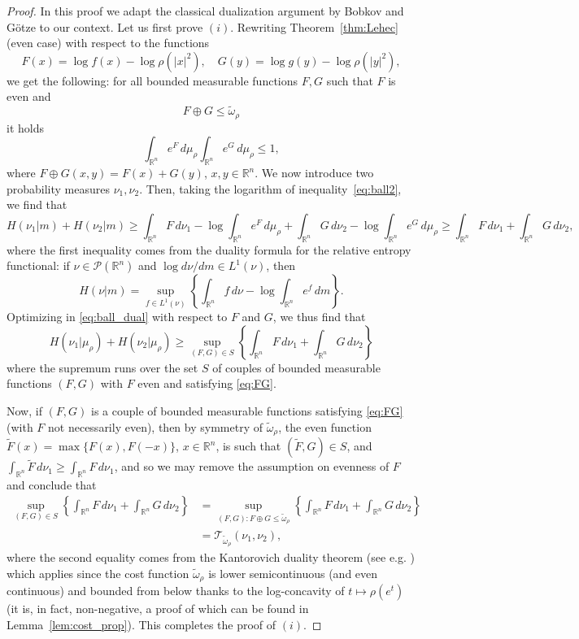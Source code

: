 \documentclass[10pt]{amsart}
\theoremstyle{definition}
\theoremstyle{remark}
\newcommand{\R}{\mathbb{R}}
\newcommand{\mc}{\mathcal}
\begin{document}
\begin{proof}
In this proof we adapt the classical dualization argument by Bobkov and G\"otze \cite{BG99} to our context. Let us first prove $(i)$. Rewriting Theorem~\ref{thm:Lehec} (even case) with respect to the functions
  \[
  F(x) = \log f(x) -\log \rho(|x|^2), \quad G(y) = \log g(y) -\log \rho(|y|^2),
  \]
  we get the following: for all bounded measurable functions $F,G$ such that $F$ is even and 
  \begin{equation}\label{eq:FG}
  F \oplus G \leq \tilde{\omega}_\rho
  \end{equation}
  it holds
  \begin{equation}\label{eq:ball2}
    \int_{\R^n}e^F\,d\mu_\rho \int_{\R^n}e^G\,d\mu_\rho \leq 1,
  \end{equation}
  where $F\oplus G(x,y) = F(x)+G(y)$, $x,y\in \R^n.$
 We now introduce two probability measures $\nu_1,\nu_2$. Then, taking the logarithm of inequality~\eqref{eq:ball2}, we find that
  \begin{equation}\label{eq:ball_dual}
   H(\nu_1|m)+H(\nu_2| m) \geq  \int_{\R^n} F\,d\nu_1 - \log  \int_{\R^n}e^F\,d\mu_\rho + \int_{\R^n} G\,d\nu_2 - \log  \int_{\R^n}e^G\,d\mu_\rho \geq \int_{\R^n} F\,d\nu_1 + \int_{\R^n} G\,d\nu_2,
  \end{equation}
where the first inequality comes from the duality formula for the relative entropy functional: if $\nu\in \mc P(\R^n)$ and $\log d\nu/dm\in L^1(\nu)$, then
  \[
  H(\nu|  m) = \sup_{f\in L^1(\nu)}\left\{ \int_{\R^n}f\,d\nu - \log\int_{\R^n}e^f\,dm\right\}.
  \]
Optimizing in \eqref{eq:ball_dual} with respect to $F$ and $G$, we thus find that
\[
    H(\nu_1|  \mu_\rho) + H(\nu_2|  \mu_\rho) \geq  \sup_{(F,G)\in S}\left\{ \int_{\R^n} F\,d\nu_1 + \int_{\R^n} G\,d\nu_2\right\}
\]
  where the supremum runs over the set $S$ of couples of bounded measurable functions $(F,G)$ with $F$ even and satisfying \eqref{eq:FG}.

Now, if $(F,G)$ is a couple of bounded measurable functions satisfying \eqref{eq:FG} (with $F$ not necessarily even), then by symmetry of $\tilde{\omega}_\rho$, the even function $\tilde F(x)=\max\{F(x),F(-x)\}$, $x\in \R^n$, is such that $(\tilde F,G)\in S$, and $\int_{\R^n} \tilde F\,d\nu_1\ge\int_{\R^n} F\,d\nu_1$, and so we may remove the assumption on evenness of $F$ and conclude that
  \begin{align*}
    \sup_{(F,G)\in S}\left\{ \int_{\R^n} F\,d\nu_1 + \int_{\R^n} G\,d\nu_2\right\} &= \sup_{(F,G) :  F\oplus G\leq\tilde{\omega}_\rho}\left\{ \int_{\R^n} F\,d\nu_1 + \int_{\R^n} G\,d\nu_2\right\}\\
    &= \mc T_{\tilde{\omega}_\rho}(\nu_1,\nu_2),
  \end{align*}
 where the second equality comes from the Kantorovich duality theorem (see e.g. \cite[Theorem 5.10]{villani_book}) which applies since the cost function $\tilde{\omega}_\rho$ is  lower semicontinuous (and even continuous) and bounded from below thanks to the log-concavity of $t\mapsto \rho(e^t)$ (it is, in fact, non-negative, a proof of which can be found in Lemma~\ref{lem:cost_prop}). This completes the proof of $(i)$.


\end{proof}
\end{document}
